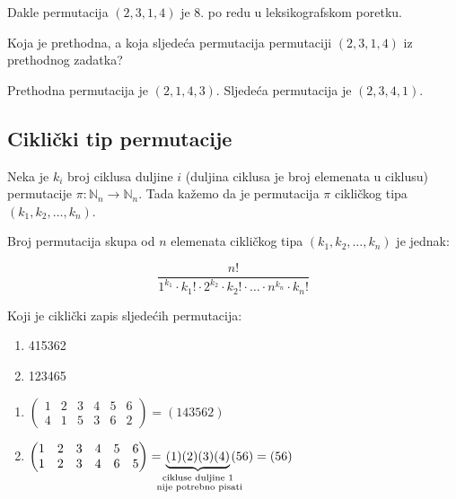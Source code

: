 Dakle permutacija $(2, 3, 1, 4)$ je 8. po redu u leksikografskom poretku.

\begin{problem}
    Koja je prethodna, a koja sljedeća permutacija permutaciji $(2, 3, 1, 4)$ iz prethodnog zadatka?
\end{problem}

Prethodna permutacija je $(2, 1, 4, 3)$.
Sljedeća permutacija je $(2, 3, 4, 1)$.

\subsection{Ciklički tip permutacije}

Neka je $k_i$ broj ciklusa duljine $i$ (duljina ciklusa je broj elemenata u ciklusu) permutacije $\pi : \mathbb{N}_n \to \mathbb{N}_n$. Tada kažemo da je permutacija $\pi$ cikličkog tipa $(k_1, k_2, \dots, k_n)$.

\begin{theorem}
    Broj permutacija skupa od $n$ elemenata cikličkog tipa $(k_1, k_2, \dots,
    k_n)$ je jednak:

    $$
        \frac{n!}{1^{k_1}\cdot k_1! \cdot 2^{k_2}\cdot k_2! \cdot \dots \cdot n^{k_n} \cdot k_n!}
    $$
\end{theorem}

\begin{problem}
    Koji je ciklički zapis sljedećih permutacija:
    \begin{enumerate}
        \item 415362
        \item 123465
    \end{enumerate}
\end{problem}

\begin{enumerate}
\item $\displaystyle
\begin{pmatrix}
    1&2&3&4&5&6\\
    4&1&5&3&6&2
\end{pmatrix} = (143562)
$

\item $\displaystyle
\begin{pmatrix}
    1&2&3&4&5&6\\
    1&2&3&4&6&5
\end{pmatrix} = \underbrace{(1)(2)(3)(4)}_{\substack{\mkern-15mu \text{cikluse duljine }1 \mkern-15mu\\ \mkern-20mu \text{ nije potrebno pisati} \mkern-20mu}}(56) = (56)
$
\end{enumerate}